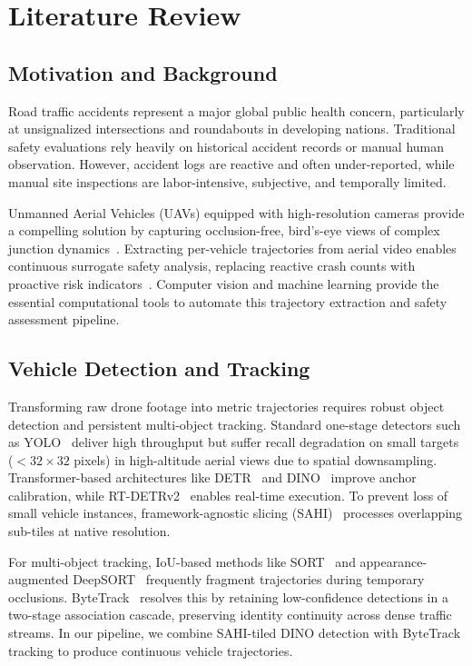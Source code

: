 \documentclass[12pt,a4paper]{report}
\begin{document}
\chapter{Literature Review}
\label{chap:lit_review}

\section{Motivation and Background}

Road traffic accidents represent a major global public health concern, particularly at unsignalized intersections and roundabouts in developing nations. Traditional safety evaluations rely heavily on historical accident records or manual human observation. However, accident logs are reactive and often under-reported, while manual site inspections are labor-intensive, subjective, and temporally limited. 

Unmanned Aerial Vehicles (UAVs) equipped with high-resolution cameras provide a compelling solution by capturing occlusion-free, bird's-eye views of complex junction dynamics~\cite{drone_roundabout, highway_tracking}. Extracting per-vehicle trajectories from aerial video enables continuous surrogate safety analysis, replacing reactive crash counts with proactive risk indicators~\cite{laureshyn2010}. Computer vision and machine learning provide the essential computational tools to automate this trajectory extraction and safety assessment pipeline.

\section{Vehicle Detection and Tracking}

Transforming raw drone footage into metric trajectories requires robust object detection and persistent multi-object tracking. Standard one-stage detectors such as YOLO~\cite{yolov8_ultralytics} deliver high throughput but suffer recall degradation on small targets ($< 32 \times 32$ pixels) in high-altitude aerial views due to spatial downsampling. Transformer-based architectures like DETR~\cite{detr} and DINO~\cite{dino} improve anchor calibration, while RT-DETRv2~\cite{rtdetr} enables real-time execution. To prevent loss of small vehicle instances, framework-agnostic slicing (SAHI)~\cite{sahi} processes overlapping sub-tiles at native resolution.

For multi-object tracking, IoU-based methods like SORT~\cite{sort} and appearance-augmented DeepSORT~\cite{deepsort} frequently fragment trajectories during temporary occlusions. ByteTrack~\cite{bytetrack} resolves this by retaining low-confidence detections in a two-stage association cascade, preserving identity continuity across dense traffic streams. In our pipeline, we combine SAHI-tiled DINO detection with ByteTrack tracking to produce continuous vehicle trajectories.
\end{document}
